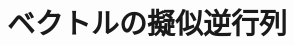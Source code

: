 \documentclass[../../../topic_linear-algebra]{subfiles}
\begin{document}
\sectionline
\section{ベクトルの擬似逆行列}

\todo{}
\end{document}
